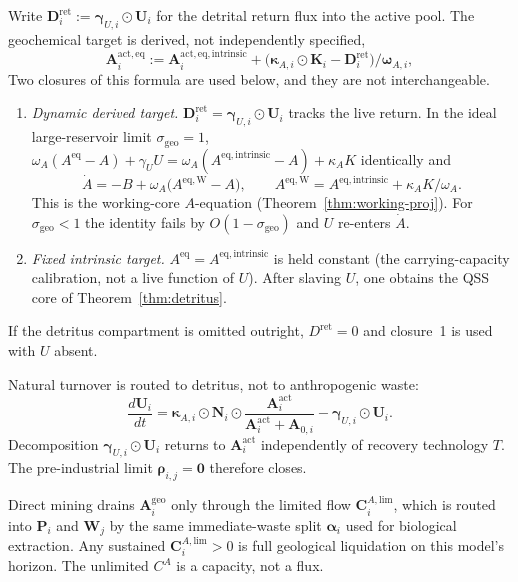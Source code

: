 \documentclass[11pt]{article}
\theoremstyle{definition}
\begin{document}
Write $\mathbf D^{\mathrm{ret}}_i:=\boldsymbol\gamma_{U,i}\odot\mathbf U_i$ for the detrital return flux into the active pool. The geochemical target is derived, not independently specified,
\begin{equation}
\mathbf A^{\mathrm{act,eq}}_i
:= \mathbf A^{\mathrm{act,eq,intrinsic}}_i + \bigl(\boldsymbol\kappa_{A,i}\odot\mathbf K_i - \mathbf D^{\mathrm{ret}}_i\bigr)/\boldsymbol\omega_{A,i},
\label{eq:aeq-derived}
\end{equation}
Two closures of this formula are used below, and they are not interchangeable.
\begin{enumerate}
\item \emph{Dynamic derived target.} $\mathbf D^{\mathrm{ret}}_i=\boldsymbol\gamma_{U,i}\odot\mathbf U_i$ tracks the live return. In the ideal large-reservoir limit $\sigma_{\mathrm{geo}}=1$, $\omega_A(A^{\mathrm{eq}}-A)+\gamma_U U=\omega_A(A^{\mathrm{eq,intrinsic}}-A)+\kappa_A K$ identically and
\[
\dot A=-B+\omega_A\bigl(A^{\mathrm{eq,W}}-A\bigr),\qquad A^{\mathrm{eq,W}}=A^{\mathrm{eq,intrinsic}}+\kappa_A K/\omega_A.
\]
This is the working-core $A$-equation (Theorem~\ref{thm:working-proj}). For $\sigma_{\mathrm{geo}}<1$ the identity fails by $O(1-\sigma_{\mathrm{geo}})$ and $U$ re-enters $\dot A$.
\item \emph{Fixed intrinsic target.} $A^{\mathrm{eq}}=A^{\mathrm{eq,intrinsic}}$ is held constant (the carrying-capacity calibration, not a live function of $U$). After slaving $U$, one obtains the QSS core of Theorem~\ref{thm:detritus}.
\end{enumerate}
If the detritus compartment is omitted outright, $D^{\mathrm{ret}}=0$ and closure~1 is used with $U$ absent.

Natural turnover is routed to detritus, not to anthropogenic waste:
\begin{equation}
\frac{d\mathbf U_i}{dt}
= \boldsymbol\kappa_{A,i}\odot\mathbf N_i\odot\frac{\mathbf A^{\mathrm{act}}_i}{\mathbf A^{\mathrm{act}}_i+\mathbf A_{0,i}}
- \boldsymbol\gamma_{U,i}\odot\mathbf U_i.
\label{eq:detritus}
\end{equation}
Decomposition $\boldsymbol\gamma_{U,i}\odot\mathbf U_i$ returns to $\mathbf A^{\mathrm{act}}_i$ independently of recovery technology $T$. The pre-industrial limit $\boldsymbol\rho_{i,j}=\mathbf 0$ therefore closes.

Direct mining drains $\mathbf A^{\mathrm{geo}}_i$ only through the limited flow $\mathbf C^{A,\mathrm{lim}}_i$, which is routed into $\mathbf P_i$ and $\mathbf W_j$ by the same immediate-waste split $\boldsymbol\alpha_i$ used for biological extraction. Any sustained $\mathbf C^{A,\mathrm{lim}}_i>0$ is full geological liquidation on this model's horizon. The unlimited $C^A$ is a capacity, not a flux.
\end{document}
